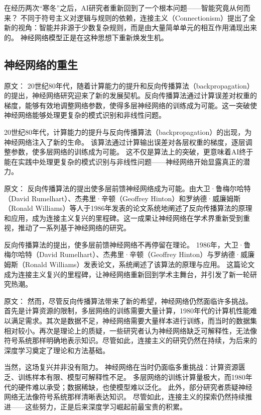 在经历两次“寒冬”之后，AI研究者重新回到了一个根本问题——智能究竟从何而来？  
不同于符号主义对逻辑与规则的依赖，连接主义（Connectionism）提出了全新的视角：智能并非源于少数复杂规则，而是由大量简单单元的相互作用涌现出来的。  
神经网络模型正是在这种思想下重新焕发生机。

\subsection{神经网络的重生}

原文：
20世纪80年代，随着计算能力的提升和反向传播算法（backpropagation）的提出，神经网络研究迎来了新的发展契机。反向传播算法通过计算误差对权重的梯度，能够有效地调整网络参数，使得多层神经网络的训练成为可能。这一突破使神经网络能够处理更复杂的模式识别和非线性问题。

20世纪80年代，计算能力的提升与反向传播算法（backpropagation）的出现，为神经网络注入了新的生命。  
该算法通过计算输出误差对各层权重的梯度，逐层调整参数，使多层网络的训练成为可能。  
这不仅是算法上的突破，更意味着AI终于能在实践中处理更复杂的模式识别与非线性问题——神经网络开始显露真正的潜力。

原文：
反向传播算法的提出使多层前馈神经网络成为可能。由大卫·鲁梅尔哈特（David Rumelhart）、杰弗里·辛顿（Geoffrey Hinton）和罗纳德·威廉姆斯（Ronald Williams）等人于1986年发表的论文系统地阐述了反向传播算法的原理和应用，成为连接主义复兴的里程碑。这一成果让神经网络在学术界重新受到重视，推动了一系列基于神经网络的研究。

反向传播算法的提出，使多层前馈神经网络不再停留在理论。  
1986年，大卫·鲁梅尔哈特（David Rumelhart）、杰弗里·辛顿（Geoffrey Hinton）与罗纳德·威廉姆斯（Ronald Williams）发表论文，系统阐述了该算法的原理与应用。  
这篇论文成为连接主义复兴的里程碑，让神经网络重新回到学术主舞台，并引发了新一轮研究热潮。

原文：
然而，尽管反向传播算法带来了新的希望，神经网络仍然面临许多挑战。首先是计算资源的限制，多层网络的训练需要大量计算，1980年代的计算机性能难以满足需求。其次是数据不足，神经网络需要大量样本进行训练，而当时的数据集相对较小。再次是理论上的质疑，一些研究者认为神经网络缺乏可解释性，无法像符号系统那样明确地表示知识。尽管如此，连接主义的研究仍然在持续，为后来的深度学习奠定了理论和方法基础。

当然，这场复兴并非没有阻力。  
神经网络在当时仍面临多重挑战：计算资源匮乏、训练样本有限、模型可解释性不足。  
多层网络的训练计算量极大，而1980年代的硬件难以承受；数据稀缺，也使模型难以泛化。  
此外，部分研究者质疑神经网络无法像符号系统那样清晰表达知识。  
尽管如此，连接主义的探索仍然持续推进——这些努力，正是后来深度学习崛起前最宝贵的积累。

